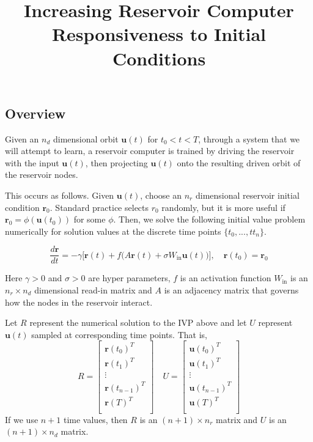 \documentclass{article}
\begin{document}
\title{Increasing Reservoir Computer Responsiveness to Initial Conditions}
\maketitle

\subsection*{Overview}

Given an $n_d$ dimensional orbit $\mathbf{u}(t)$ for $t_0 < t < T$, through a system that we will attempt to learn, a reservoir computer is trained by driving the reservoir with the input $\mathbf{u}(t)$, then projecting $\mathbf{u}(t)$ onto the resulting driven orbit of the reservoir nodes. 

This occurs as follows. Given $\mathbf{u}(t)$, choose an $n_r$ dimensional reservoir initial condition $\mathbf{r}_0$. Standard practice selects $r_0$ randomly, but it is more useful if $\mathbf{r}_0 = \phi(\mathbf{u}(t_0))$ for some $\phi$. Then, we solve the following initial value problem numerically for solution values at the discrete time points $\{t_0, ..., tt_n\}$.

\begin{equation} \label{untrained}
\frac{d\mathbf{r}}{dt} = -\gamma\big[\mathbf{r}(t) + f\big(A\mathbf{r}(t) + \sigma W_\text{in} \mathbf{u}(t)\big)\big], \quad
\mathbf{r}(t_0) = \mathbf{r}_0
\end{equation}

Here $\gamma > 0$ and $\sigma > 0$ are hyper parameters, $f$ is an activation function $W_\text{in}$ is an $n_r \times n_d$ dimensional read-in matrix and  $A$ is an adjacency matrix that governs how the nodes in the reservoir interact. 

Let $R$ represent the numerical solution to the IVP above and let $U$ represent $\mathbf{u}(t)$ sampled at corresponding time points. That is,
\[
R =
\begin{bmatrix}
\mathbf{r}(t_0)^T \\
\mathbf{r}(t_1)^T \\
\vdots \\
\mathbf{r}(t_{n-1})^T \\
\mathbf{r}(T)^T \\
\end{bmatrix}
\quad 
U =
\begin{bmatrix}
\mathbf{u}(t_0)^T \\
\mathbf{u}(t_1)^T \\
\vdots \\
\mathbf{u}(t_{n-1})^T \\
\mathbf{u}(T)^T \\
\end{bmatrix}
\]
If we use $n+1$ time values, then $R$ is an $(n+1)\times n_r$ matrix and $U$ is an $(n+1)\times n_d$ matrix.
\end{document}
